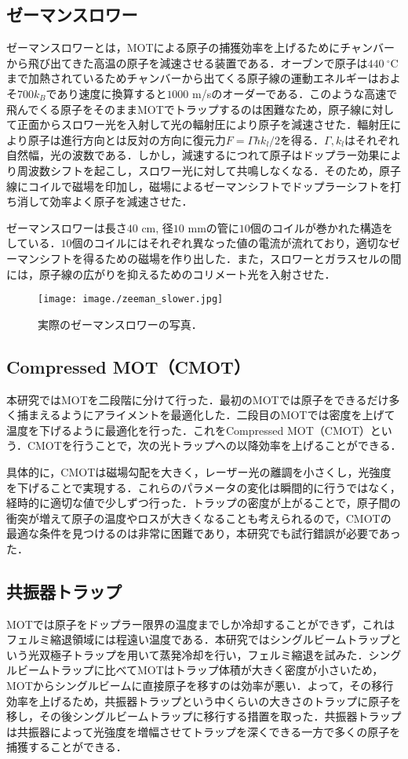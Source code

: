 \documentclass[11pt,a4j,notitlepage]{jreport}
\begin{document}
\subsection{ゼーマンスロワー}
ゼーマンスロワーとは，MOTによる原子の捕獲効率を上げるためにチャンバーから飛び出てきた高温の原子を減速させる装置である．オーブンで原子は$440\ ^{\circ}\mathrm{C}$まで加熱されているためチャンバーから出てくる原子線の運動エネルギーはおよそ$700k_B$であり速度に換算すると$1000$ m/sのオーダーである．このような高速で飛んでくる原子をそのままMOTでトラップするのは困難なため，原子線に対して正面からスロワー光を入射して光の輻射圧により原子を減速させた．輻射圧により原子は進行方向とは反対の方向に復元力$F = \Gamma \hbar k_l / 2$を得る．$\Gamma, k_l$はそれぞれ自然幅，光の波数である．しかし，減速するにつれて原子はドップラー効果により周波数シフトを起こし，スロワー光に対して共鳴しなくなる．そのため，原子線にコイルで磁場を印加し，磁場によるゼーマンシフトでドップラーシフトを打ち消して効率よく原子を減速させた．

ゼーマンスロワーは長さ$40$ cm, 径$10$ mmの管に$10$個のコイルが巻かれた構造をしている．$10$個のコイルにはそれぞれ異なった値の電流が流れており，適切なゼーマンシフトを得るための磁場を作り出した．また，スロワーとガラスセルの間には，原子線の広がりを抑えるためのコリメート光を入射させた．
\begin{figure}[h]
	\centering
		\texttt{[image: image./zeeman\_slower.jpg]}
	\caption{実際のゼーマンスロワーの写真．}
	\label{fig3.3.6}
\end{figure}

\subsection{Compressed MOT（CMOT）}
本研究ではMOTを二段階に分けて行った．最初のMOTでは原子をできるだけ多く捕まえるようにアライメントを最適化した．二段目のMOTでは密度を上げて温度を下げるように最適化を行った．これをCompressed MOT（CMOT）という．CMOTを行うことで，次の光トラップへの以降効率を上げることができる．

具体的に，CMOTは磁場勾配を大きく，レーザー光の離調を小さくし，光強度を下げることで実現する．これらのパラメータの変化は瞬間的に行うではなく，経時的に適切な値で少しずつ行った．トラップの密度が上がることで，原子間の衝突が増えて原子の温度やロスが大きくなることも考えられるので，CMOTの最適な条件を見つけるのは非常に困難であり，本研究でも試行錯誤が必要であった．

\subsection{共振器トラップ}
MOTでは原子をドップラー限界の温度までしか冷却することができず，これはフェルミ縮退領域には程遠い温度である．本研究ではシングルビームトラップという光双極子トラップを用いて蒸発冷却を行い，フェルミ縮退を試みた．シングルビームトラップに比べてMOTはトラップ体積が大きく密度が小さいため，MOTからシングルビームに直接原子を移すのは効率が悪い．よって，その移行効率を上げるため，共振器トラップという中くらいの大きさのトラップに原子を移し，その後シングルビームトラップに移行する措置を取った．共振器トラップは共振器によって光強度を増幅させてトラップを深くできる一方で多くの原子を捕獲することができる．
\end{document}
